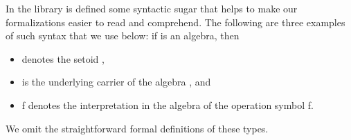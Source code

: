 In the \agdaalgebras library is defined some syntactic sugar that helps to make our
formalizations easier to read and comprehend.
The following are three examples of such syntax that we use below: if  is an algebra, then
\begin{itemize}
\item {} denotes the setoid  ,
\item {} is the underlying carrier of the algebra , and
\item \ab f   denotes the interpretation in the algebra  of the operation symbol \ab f.
\end{itemize}
\ifshort %
 We omit the straightforward formal definitions of these types.
\else    %
